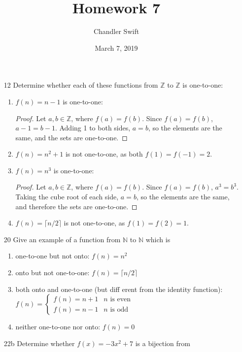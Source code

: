 \documentclass{article}
\title{Homework 7}
\author{Chandler Swift}
\date{March 7, 2019}
\begin{document}
\maketitle
\begin{enumerate}
  \item[12] Determine whether each of these functions from $\mathbb{Z}$ to
    $\mathbb{Z}$ is one-to-one:
    \begin{enumerate}
      \item $f(n) = n-1$ is one-to-one:
        \begin{proof}
          Let $a,b \in \mathbb{Z}$, where $f(a) = f(b)$. Since $f(a)=f(b)$,
          $a-1=b-1$. Adding 1 to both sides, $a=b$, so the elements are the
          same, and the sets are one-to-one.
        \end{proof}
      \item $f(n) = n^2 + 1$ is not one-to-one, as both $f(1)=f(-1)=2$.
      \item $f(n) = n^3$ is one-to-one:
        \begin{proof}
          Let $a,b \in \mathbb{Z}$, where $f(a) = f(b)$. Since $f(a)=f(b)$,
          $a^3=b^3$. Taking the cube root of each side, $a=b$, so the elements
          are the same, and therefore the sets are one-to-one.
        \end{proof}
      \item $f(n) = \lceil n/2 \rceil$ is not one-to-one, as $f(1) = f(2) = 1$.
    \end{enumerate}
  \item[20] Give an example of a function from $\mathbb{N}$ to $\mathbb{N}$
    which is
    \begin{enumerate}
      \item one-to-one but not onto: $f(n)=n^2$
      \item onto but not one-to-one: $f(n)=\lceil n/2 \rceil$
      \item both onto and one-to-one (but diff erent from the identity function):\\
        $f(n)=\begin{cases}
            f(n) = n+1 & n \text{ is even}\\
            f(n) = n-1 & n \text{ is odd}
          \end{cases}$
      \item neither one-to-one nor onto: $f(n)=0$
      \end{enumerate}
    \item[22b] Determine whether $f(x) = -3x^2 + 7$ is a bijection from

\end{enumerate}
\end{document}
